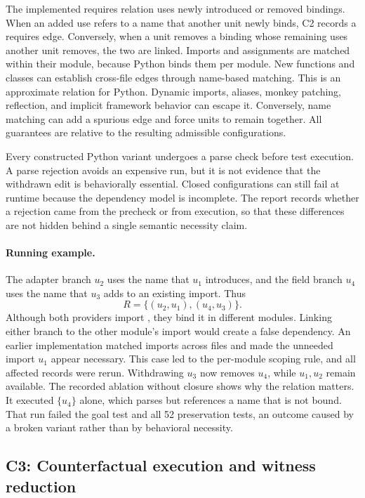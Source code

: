 \documentclass[a4paper,fleqn]{cas-sc}
\newcommand{\code}[1]{\texttt{\detokenize{#1}}}
\begin{document}
The implemented requires relation uses newly introduced or removed bindings. When an added use refers to a name that another unit newly binds, C2 records a requires edge. Conversely, when a unit removes a binding whose remaining uses another unit removes, the two are linked. Imports and assignments are matched within their module, because Python binds them per module. New functions and classes can establish cross-file edges through name-based matching. This is an approximate relation for Python. Dynamic imports, aliases, monkey patching, reflection, and implicit framework behavior can escape it. Conversely, name matching can add a spurious edge and force units to remain together. All guarantees are relative to the resulting admissible configurations.

Every constructed Python variant undergoes a parse check before test execution. A parse rejection avoids an expensive run, but it is not evidence that the withdrawn edit is behaviorally essential. Closed configurations can still fail at runtime because the dependency model is incomplete. The report records whether a rejection came from the precheck or from execution, so that these differences are not hidden behind a single semantic necessity claim.

\paragraph{Running example.}
The adapter branch $u_2$ uses the name that $u_1$ introduces, and the field branch $u_4$ uses the name that $u_3$ adds to an existing import. Thus
\[
R=\{(u_2,u_1),(u_4,u_3)\}.
\]
Although both providers import \code{LazyObject}, they bind it in different modules. Linking either branch to the other module's import would create a false dependency. An earlier implementation matched imports across files and made the unneeded import $u_1$ appear necessary. This case led to the per-module scoping rule, and all affected records were rerun. Withdrawing $u_3$ now removes $u_4$, while $u_1,u_2$ remain available. The recorded ablation without closure shows why the relation matters. It executed $\{u_4\}$ alone, which parses but references a name that is not bound. That run failed the goal test and all 52 preservation tests, an outcome caused by a broken variant rather than by behavioral necessity.

\subsection{C3: Counterfactual execution and witness reduction}\label{sec:triage}
\end{document}
